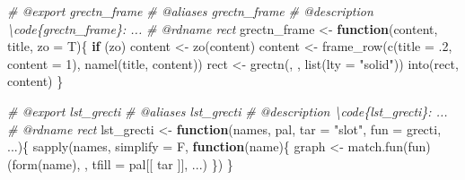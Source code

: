 \documentclass[
]{article}
\newenvironment{Shaded}{\begin{snugshade}}{\end{snugshade}}
\newcommand{\AttributeTok}[1]{\textcolor[rgb]{0.77,0.63,0.00}{#1}}
\newcommand{\CommentTok}[1]{\textcolor[rgb]{0.56,0.35,0.01}{\textit{#1}}}
\newcommand{\ControlFlowTok}[1]{\textcolor[rgb]{0.13,0.29,0.53}{\textbf{#1}}}
\newcommand{\DecValTok}[1]{\textcolor[rgb]{0.00,0.00,0.81}{#1}}
\newcommand{\FunctionTok}[1]{\textcolor[rgb]{0.00,0.00,0.00}{#1}}
\newcommand{\NormalTok}[1]{#1}
\newcommand{\OtherTok}[1]{\textcolor[rgb]{0.56,0.35,0.01}{#1}}
\newcommand{\StringTok}[1]{\textcolor[rgb]{0.31,0.60,0.02}{#1}}
\begin{document}
\begin{Shaded}
\begin{Highlighting}[]
\CommentTok{\#\textquotesingle{} @export grectn\_frame}
\CommentTok{\#\textquotesingle{} @aliases grectn\_frame}
\CommentTok{\#\textquotesingle{} @description \textbackslash{}code\{grectn\_frame\}: ...}
\CommentTok{\#\textquotesingle{} @rdname rect}
\NormalTok{grectn\_frame }\OtherTok{\textless{}{-}} \ControlFlowTok{function}\NormalTok{(content, title, }\AttributeTok{zo =}\NormalTok{ T)\{}
  \ControlFlowTok{if}\NormalTok{ (zo) content }\OtherTok{\textless{}{-}} \FunctionTok{zo}\NormalTok{(content)}
\NormalTok{  content }\OtherTok{\textless{}{-}} \FunctionTok{frame\_row}\NormalTok{(}\FunctionTok{c}\NormalTok{(}\AttributeTok{title =}\NormalTok{ .}\DecValTok{2}\NormalTok{, }\AttributeTok{content =} \DecValTok{1}\NormalTok{), }\FunctionTok{namel}\NormalTok{(title, content))}
\NormalTok{  rect }\OtherTok{\textless{}{-}} \FunctionTok{grectn}\NormalTok{(, , }\FunctionTok{list}\NormalTok{(}\AttributeTok{lty =} \StringTok{"solid"}\NormalTok{))}
  \FunctionTok{into}\NormalTok{(rect, content)}
\NormalTok{\}}

\CommentTok{\#\textquotesingle{} @export lst\_grecti}
\CommentTok{\#\textquotesingle{} @aliases lst\_grecti}
\CommentTok{\#\textquotesingle{} @description \textbackslash{}code\{lst\_grecti\}: ...}
\CommentTok{\#\textquotesingle{} @rdname rect}
\NormalTok{lst\_grecti }\OtherTok{\textless{}{-}} \ControlFlowTok{function}\NormalTok{(names, pal, }\AttributeTok{tar =} \StringTok{"slot"}\NormalTok{, }\AttributeTok{fun =}\NormalTok{ grecti, ...)\{}
  \FunctionTok{sapply}\NormalTok{(names, }\AttributeTok{simplify =}\NormalTok{ F,}
    \ControlFlowTok{function}\NormalTok{(name)\{}
\NormalTok{      graph }\OtherTok{\textless{}{-}} \FunctionTok{match.fun}\NormalTok{(fun)(}\FunctionTok{form}\NormalTok{(name), , }\AttributeTok{tfill =}\NormalTok{ pal[[ tar ]], ...)}
\NormalTok{    \})}
\NormalTok{\}}


\end{Highlighting}
\end{Shaded}
\end{document}
